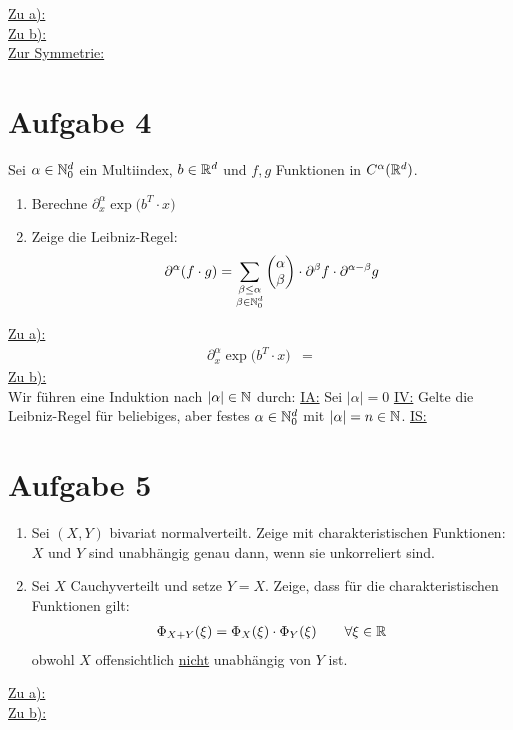 \documentclass[12pt,a4paper]{article}
\begin{document}
\begin{lösung}
\underline{Zu a):}\\
\underline{Zu b):}\\
\underline{Zur Symmetrie:}\\
\end{lösung}

\section*{Aufgabe 4}
Sei $\alpha\in\mathbb{N}_0^d$ ein Multiindex, $b\in\mathbb{R}^d$ und $f,g$ Funktionen in $C^\alpha(\mathbb{R}^d)$.
\begin{enumerate}[label=\alph*)]
\item Berechne $\partial_x^\alpha\exp\big(b^T\cdot x\big)$
\item Zeige die Leibniz-Regel:
\begin{align*}
\partial^\alpha(f\cdot g)=\sum\limits_{\begin{subarray}{c}\beta\leq\alpha\\\beta\in\mathbb{N}_0^d\end{subarray}}\begin{pmatrix}
\alpha\\\beta
\end{pmatrix}\cdot\partial^\beta f\cdot\partial^{\alpha-\beta}g
\end{align*}
\end{enumerate}

\begin{lösung}
\underline{Zu a):}
\begin{align*}
\partial_x^\alpha\exp\big(b^T\cdot x\big)
&=
\end{align*}
\underline{Zu b):}\\
Wir führen eine Induktion nach $|\alpha|\in\mathbb{N}$ durch:\nl
\ul{IA:} Sei $|\alpha|=0$ %
\nl
\ul{IV:} Gelte die Leibniz-Regel für beliebiges, aber festes $\alpha\in\mathbb{N}_0^d$ mit $|\alpha|=n\in\mathbb{N}$.\nl
\ul{IS:}
\end{lösung}

\section*{Aufgabe 5}
\begin{enumerate}[label=\alph*)]
\item Sei $(X,Y)$ bivariat normalverteilt. Zeige mit charakteristischen Funktionen: $X$ und $Y$ sind unabhängig genau dann, wenn sie unkorreliert sind.
\item Sei $X$ Cauchyverteilt und setze $Y=X$. Zeige, dass für die charakteristischen Funktionen gilt:
\begin{align*}
\Phi_{X+Y}(\xi)=\Phi_X(\xi)\cdot\Phi_Y(\xi)\qquad\forall\xi\in\mathbb{R}
\end{align*} 
obwohl $X$ offensichtlich \ul{nicht} unabhängig von $Y$ ist.
\end{enumerate}

\begin{lösung}
\underline{Zu a):}\\
\underline{Zu b):}\\
\end{lösung}
\end{document}
